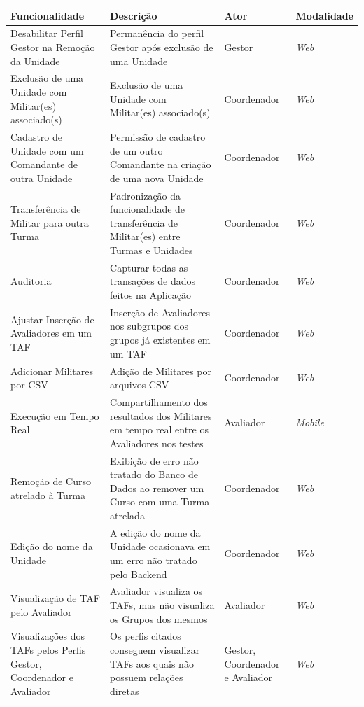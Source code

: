 \begin{quadro}[H]
    \caption{Pendências de POC II \label{quad:pendencias_poc_ii}}
    \centering
    \begin{tabular}{|>{\raggedright\arraybackslash}p{4cm}|
                >{\raggedright\arraybackslash}p{4cm}|
                >{\raggedright\arraybackslash}p{2cm}|
                >{\raggedright\arraybackslash}p{2cm}|}
        \hline
        Funcionalidade & Descrição & Ator & Modalidade \\
        \hline
        Desabilitar Perfil Gestor na Remoção da Unidade & Permanência do perfil Gestor após exclusão de uma Unidade & Gestor & \textit{Web} \\
        \hline
        Exclusão de uma Unidade com Militar(es) associado(s) & Exclusão de uma Unidade com Militar(es) associado(s) &Coordenador & \textit{Web} \\
        \hline
        Cadastro de Unidade com um Comandante de outra Unidade & Permissão de cadastro de um outro Comandante na criação de uma nova Unidade & Coordenador & \textit{Web} \\
        \hline
        Transferência de Militar para outra Turma & Padronização da funcionalidade de transferência de Militar(es) entre Turmas e Unidades & Coordenador & \textit{Web} \\
        \hline
        Auditoria & Capturar todas as transações de dados feitos na Aplicação & Coordenador & \textit{Web} \\
        \hline
        Ajustar Inserção de Avaliadores em um TAF & Inserção de Avaliadores nos subgrupos dos grupos já existentes em um TAF & Coordenador & \textit{Web} \\
        \hline
        Adicionar Militares por CSV & Adição de Militares por arquivos CSV & Coordenador & \textit{Web} \\
        \hline
        Execução em Tempo Real & Compartilhamento dos resultados dos Militares em tempo real entre os Avaliadores nos testes & Avaliador & \textit{Mobile} \\
        \hline
        Remoção de Curso atrelado à Turma & Exibição de erro não tratado do Banco de Dados ao remover um Curso com uma Turma atrelada & Coordenador & \textit{Web} \\
        \hline
        Edição do nome da Unidade & A edição do nome da Unidade ocasionava em um erro não tratado pelo Backend & Coordenador & \textit{Web} \\
        \hline
        Visualização de TAF pelo Avaliador & Avaliador visualiza os TAFs, mas não visualiza os Grupos dos mesmos & Avaliador & \textit{Web} \\
        \hline
        Visualizações dos TAFs pelos Perfis Gestor, Coordenador e Avaliador & Os perfis citados conseguem visualizar TAFs aos quais não possuem relações diretas & Gestor, Coordenador e Avaliador & \textit{Web} \\
        \hline
    \end{tabular}
\end{quadro}

